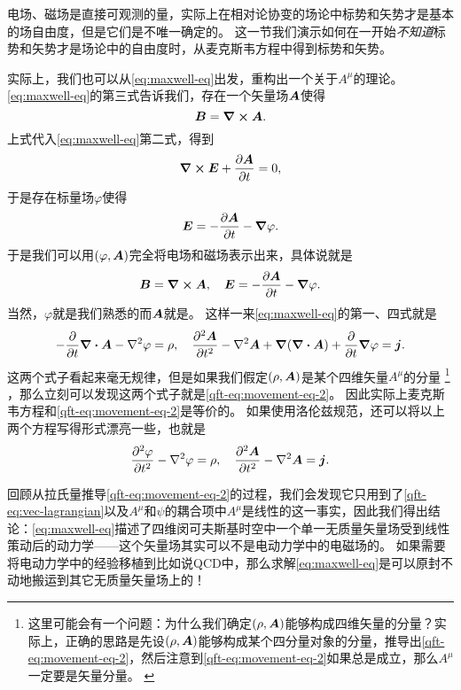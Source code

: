 电场、磁场是直接可观测的量，实际上在相对论协变的场论中标势和矢势才是基本的场自由度，但是它们是不唯一确定的。
这一节我们演示如何在一开始\emph{不知道}标势和矢势才是场论中的自由度时，从麦克斯韦方程中得到标势和矢势。

实际上，我们也可以从\eqref{eq:maxwell-eq}出发，重构出一个关于$A^\mu$的理论。
\eqref{eq:maxwell-eq}的第三式告诉我们，存在一个矢量场$\vb*{A}$使得
\[
    \vb*{B} = \curl{\vb*{A}}.
\]
上式代入\eqref{eq:maxwell-eq}第二式，得到
\[
    \curl{\vb*{E} + \pdv{\vb*{A}}{t}} = 0,
\]
于是存在标量场$\varphi$使得
\[
    \vb*{E} = - \pdv{\vb*{A}}{t} - \grad{\varphi}.
\]
于是我们可以用$(\varphi, \vb*{A})$完全将电场和磁场表示出来，具体说就是
\begin{equation}
    \vb*{B} = \curl{\vb*{A}}, \quad \vb*{E} = - \pdv{\vb*{A}}{t} - \grad{\varphi}.
    \label{eq:e-b-from-a-phi}
\end{equation}
当然，$\varphi$就是我们熟悉的而$\vb*{A}$就是。
这样一来\eqref{eq:maxwell-eq}的第一、四式就是
\[
    - \pdv{t} \div{\vb*{A}} - \laplacian \varphi = \rho, \quad \pdv[2]{\vb*{A}}{t} - \laplacian \vb*{A} + \grad(\div{\vb*{A}}) + \pdv{t} \grad{\varphi} = \vb*{j}.
\]
这两个式子看起来毫无规律，但是如果我们假定$(\rho, \vb*{A})$是某个四维矢量$A^\mu$的分量%
\footnote{这里可能会有一个问题：为什么我们确定$(\rho, \vb*{A})$能够构成四维矢量的分量？实际上，正确的思路是先设$(\rho, \vb*{A})$能够构成某个四分量对象的分量，推导出\eqref{qft-eq:movement-eq-2}，然后注意到\eqref{qft-eq:movement-eq-2}如果总是成立，那么$A^\mu$一定要是矢量分量。
\label{note:vector-component}}%
，那么立刻可以发现这两个式子就是\eqref{qft-eq:movement-eq-2}。
因此实际上麦克斯韦方程和\eqref{qft-eq:movement-eq-2}是等价的。
如果使用洛伦兹规范，还可以将以上两个方程写得形式漂亮一些，也就是
\begin{equation}
    \pdv[2]{\varphi}{t} - \laplacian \varphi = \rho, \quad \pdv[2]{\vb*{A}}{t} - \laplacian \vb*{A} = \vb*{j}.
    \label{eq:wave-eq}
\end{equation}

回顾从拉氏量推导\eqref{qft-eq:movement-eq-2}的过程，我们会发现它只用到了\eqref{qft-eq:vec-lagrangian}以及$A^\mu$和$\psi$的耦合项中$A^\mu$是线性的这一事实，因此我们得出结论：\eqref{eq:maxwell-eq}描述了四维闵可夫斯基时空中一个单一无质量矢量场受到线性策动后的动力学——这个矢量场其实可以不是电动力学中的电磁场的。
如果需要将电动力学中的经验移植到比如说QCD中，那么求解\eqref{eq:maxwell-eq}是可以原封不动地搬运到其它无质量矢量场上的！

